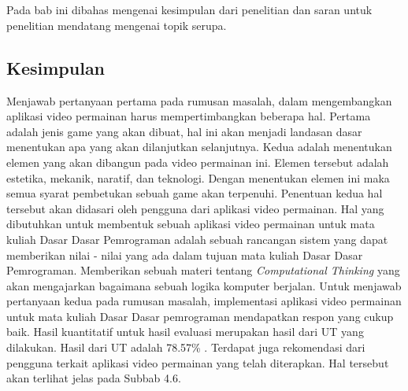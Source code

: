 \chapter{\babLima}
Pada bab ini dibahas mengenai kesimpulan dari penelitian dan saran untuk penelitian
mendatang mengenai topik serupa.
\section{Kesimpulan}
Menjawab pertanyaan pertama pada rumusan masalah, dalam mengembangkan aplikasi video permainan harus mempertimbangkan beberapa hal. Pertama adalah jenis game yang akan dibuat, hal ini akan menjadi landasan dasar menentukan apa yang akan dilanjutkan selanjutnya. Kedua adalah menentukan elemen yang akan dibangun pada video permainan ini. Elemen tersebut adalah estetika, mekanik, naratif, dan teknologi. Dengan menentukan elemen ini maka semua syarat pembetukan sebuah game akan terpenuhi. Penentuan kedua hal tersebut akan didasari oleh pengguna dari aplikasi video permainan. Hal yang dibutuhkan untuk membentuk sebuah aplikasi video permainan untuk mata kuliah Dasar Dasar Pemrograman adalah sebuah rancangan sistem yang dapat memberikan nilai - nilai yang ada dalam tujuan mata kuliah Dasar Dasar Pemrograman. Memberikan sebuah materi tentang \textit{Computational Thinking} yang akan mengajarkan bagaimana sebuah logika komputer berjalan.
\linebreak\linebreak
Untuk menjawab pertanyaan kedua pada rumusan masalah, implementasi aplikasi video permainan untuk mata kuliah Dasar Dasar pemrograman mendapatkan respon yang cukup baik. Hasil kuantitatif untuk hasil evaluasi merupakan hasil dari UT yang dilakukan. Hasil dari UT adalah 78.57\% . Terdapat juga rekomendasi dari pengguna terkait aplikasi video permainan yang telah diterapkan. Hal tersebut akan terlihat jelas pada Subbab 4.6.

